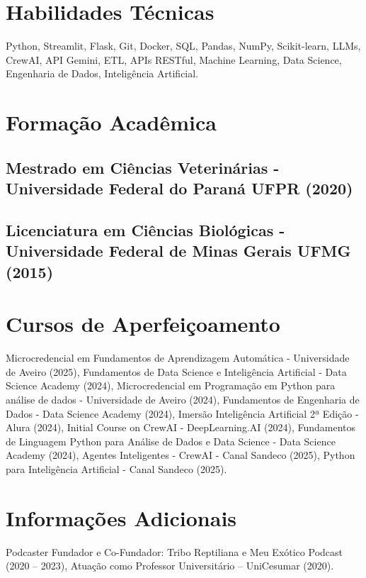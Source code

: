 \documentclass{article}
\begin{document}
\section*{Habilidades Técnicas}
Python, Streamlit, Flask, Git, Docker, SQL, Pandas, NumPy, Scikit-learn, LLMs, CrewAI, API Gemini, ETL, APIs RESTful, Machine Learning, Data Science, Engenharia de Dados, Inteligência Artificial.

\section*{Formação Acadêmica}

\subsection*{Mestrado em Ciências Veterinárias - Universidade Federal do Paraná UFPR (2020)}
\subsection*{Licenciatura em Ciências Biológicas - Universidade Federal de Minas Gerais UFMG (2015)}

\section*{Cursos de Aperfeiçoamento}
Microcredencial em Fundamentos de Aprendizagem Automática - Universidade de Aveiro (2025), Fundamentos de Data Science e Inteligência Artificial - Data Science Academy (2024), Microcredencial em Programação em Python para análise de dados - Universidade de Aveiro (2024), Fundamentos de Engenharia de Dados - Data Science Academy (2024), Imersão Inteligência Artificial 2ª Edição - Alura (2024), Initial Course on CrewAI - DeepLearning.AI (2024), Fundamentos de Linguagem Python para Análise de Dados e Data Science - Data Science Academy (2024), Agentes Inteligentes - CrewAI - Canal Sandeco (2025), Python para Inteligência Artificial - Canal Sandeco (2025).

\section*{Informações Adicionais}
Podcaster Fundador e Co-Fundador: Tribo Reptiliana e Meu Exótico Podcast (2020 – 2023), Atuação como Professor Universitário – UniCesumar (2020).
\end{document}
